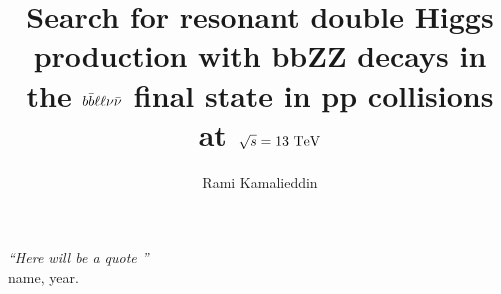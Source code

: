 \documentclass[print]{nuthesis}
\newcommand{\bbbar}{\ensuremath{b\bar{b}}\xspace}
\begin{document}
%
%


\renewcommand\bibname{References}
\frontmatter

\title{Search for resonant double Higgs production with \MakeLowercase{bb}ZZ decays in the $\MakeLowercase{\bbbar\ell\ell\nu\bar{\nu}}$ final state in \MakeLowercase{pp} collisions at ${\sqrt{\MakeLowercase{s}}=\textrm{13 T\MakeLowercase{e}V}}$}

\author{Rami Kamalieddin}

\maketitle
\begin{abstract}


\end{abstract}


\begin{dedication}
  {\huge \textit{``Here will be a quote ''}}\\{\footnotesize name, year.}\\ \ \\
  \vspace{4cm}
\end{dedication}
\end{document}
